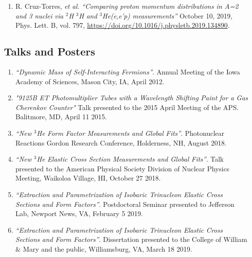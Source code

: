 \documentclass[letterpaper,10pt]{article}
\renewenvironment{itemize}{
  \begin{list}{}{
    \setlength{\leftmargin}{1.5em}
  }
}{
  \end{list}
}
\begin{document}
{\begin{enumerate}

\item R. Cruz-Torres, \textit{et al.} \textit{``Comparing proton momentum distributions in A=2 and 3 nuclei via $^2$H $^3$H and $^3$He(e,e'p) measurements''} October 10, 2019, Phys. Lett. B, vol. 797, \url{https://doi.org/10.1016/j.physletb.2019.134890}.

\end{enumerate}
\subsection*{Talks and Posters}


	\begin{enumerate}\itemsep1pt \parskip2pt 
		\setcounter{enumi}{0}
		\item \textit{``Dynamic Mass of Self-Interacting Fermions''}. Annual Meeting of the Iowa Academy of Sciences, Mason City, IA, April 2012.

		\item \textit{"9125B ET Photomultiplier Tubes with a Wavelength Shifting Paint for a Gas Cherenkov Counter"} Talk presented to the 2015 April Meeting of the APS. Balitmore, MD, April 11 2015. 
		
		\item \textit{``New $^3$He Form Factor Measurements and Global Fits''}. Photonuclear Reactions Gordon Research Conference, Holderness, NH, August 2018.
		
		\item \textit{``New $^3$He Elastic Cross Section Measurements and Global Fits''}. Talk presented to the American Physical Society Division of Nuclear Physics Meeting, Waikoloa Village, HI, October 27 2018.
		
		\item \textit{``Extraction and Parametrization of Isobaric Trinucleon Elastic Cross Sections and Form Factors''}. Postdoctoral Seminar presented to Jefferson Lab, Newport News, VA, February 5 2019.
		
		\item \textit{``Extraction and Parametrization of Isobaric Trinucleon Elastic Cross Sections and Form Factors''}. Dissertation presented to the College of William $\&$ Mary and the public, Williamsburg, VA, March 18 2019.
		

\end{enumerate}}
\end{document}
